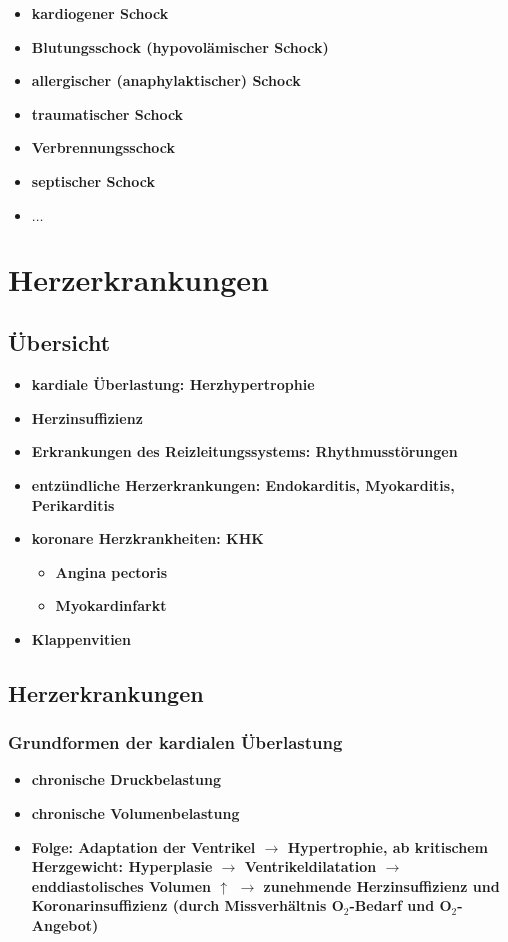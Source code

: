 \begin{itemize}
				\begin{itemize}
					\item \textbf{kardiogener Schock}
					\item \textbf{Blutungsschock (hypovolämischer Schock)}
					\item \textbf{allergischer (anaphylaktischer) Schock}
					\item \textbf{traumatischer Schock}
					\item \textbf{Verbrennungsschock}
					\item \textbf{septischer Schock}
					\item \textbf{$\dots$}
				\end{itemize}
		\end{itemize}
		
\section{Herzerkrankungen}
	\subsection{Übersicht}
		\begin{itemize}
			\item \textbf{kardiale Überlastung: Herzhypertrophie}
			\item \textbf{Herzinsuffizienz}
			\item \textbf{Erkrankungen des Reizleitungssystems: Rhythmusstörungen}
			\item \textbf{entzündliche Herzerkrankungen: Endokarditis, Myokarditis, Perikarditis}
			\item \textbf{koronare Herzkrankheiten: KHK}
				\begin{itemize}
					\item \textbf{Angina pectoris}
					\item \textbf{Myokardinfarkt}
				\end{itemize}
			\item \textbf{Klappenvitien}
		\end{itemize}
	\subsection{Herzerkrankungen}
		\subsubsection{Grundformen der kardialen Überlastung}
			\begin{itemize}
				\item \textbf{chronische Druckbelastung}
				\item \textbf{chronische Volumenbelastung}
				\item \textbf{Folge: Adaptation der Ventrikel  $\rightarrow$  Hypertrophie, ab kritischem Herzgewicht: Hyperplasie  $\rightarrow$ Ventrikeldilatation  $\rightarrow$  enddiastolisches Volumen $\uparrow$ $\rightarrow$  zunehmende Herzinsuffizienz und Koronarinsuffizienz (durch Missverhältnis O$_2$-Bedarf und  O$_2$-Angebot) }
			\end{itemize}
